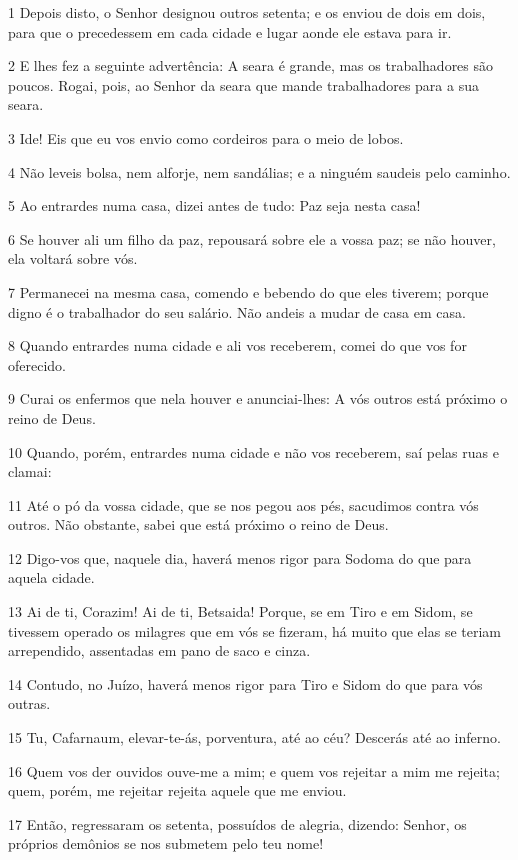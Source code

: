 \par 1 Depois disto, o Senhor designou outros setenta; e os enviou de dois em dois, para que o precedessem em cada cidade e lugar aonde ele estava para ir.
\par 2 E lhes fez a seguinte advertência: A seara é grande, mas os trabalhadores são poucos. Rogai, pois, ao Senhor da seara que mande trabalhadores para a sua seara.
\par 3 Ide! Eis que eu vos envio como cordeiros para o meio de lobos.
\par 4 Não leveis bolsa, nem alforje, nem sandálias; e a ninguém saudeis pelo caminho.
\par 5 Ao entrardes numa casa, dizei antes de tudo: Paz seja nesta casa!
\par 6 Se houver ali um filho da paz, repousará sobre ele a vossa paz; se não houver, ela voltará sobre vós.
\par 7 Permanecei na mesma casa, comendo e bebendo do que eles tiverem; porque digno é o trabalhador do seu salário. Não andeis a mudar de casa em casa.
\par 8 Quando entrardes numa cidade e ali vos receberem, comei do que vos for oferecido.
\par 9 Curai os enfermos que nela houver e anunciai-lhes: A vós outros está próximo o reino de Deus.
\par 10 Quando, porém, entrardes numa cidade e não vos receberem, saí pelas ruas e clamai:
\par 11 Até o pó da vossa cidade, que se nos pegou aos pés, sacudimos contra vós outros. Não obstante, sabei que está próximo o reino de Deus.
\par 12 Digo-vos que, naquele dia, haverá menos rigor para Sodoma do que para aquela cidade.
\par 13 Ai de ti, Corazim! Ai de ti, Betsaida! Porque, se em Tiro e em Sidom, se tivessem operado os milagres que em vós se fizeram, há muito que elas se teriam arrependido, assentadas em pano de saco e cinza.
\par 14 Contudo, no Juízo, haverá menos rigor para Tiro e Sidom do que para vós outras.
\par 15 Tu, Cafarnaum, elevar-te-ás, porventura, até ao céu? Descerás até ao inferno.
\par 16 Quem vos der ouvidos ouve-me a mim; e quem vos rejeitar a mim me rejeita; quem, porém, me rejeitar rejeita aquele que me enviou.
\par 17 Então, regressaram os setenta, possuídos de alegria, dizendo: Senhor, os próprios demônios se nos submetem pelo teu nome!
